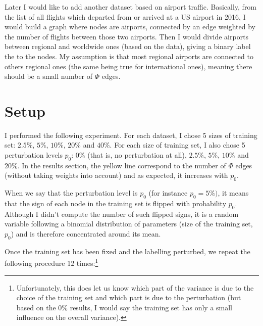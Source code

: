\documentclass[a4paper,final,notitlepage,11pt,svgnames]{article}
\begin{document}
Later I would like to add another dataset based on airport traffic. Basically,
from the list of all flights which departed from or arrived at a US airport in
2016, I would build a graph where nodes are airports, connected by an edge
weighted by the number of flights between those two airports. Then I would
divide airports between regional and worldwide ones (based on the data), giving
a binary label the to the nodes. My assumption is that most regional airports
are connected to others regional ones (the same being true for international
ones), meaning there should be a small number of $\Phi$ edges.

\section*{Setup}
\label{sec:Protocol}

I performed the following experiment. For each dataset, I chose 5 sizes of
training set: $2.5\%$, $5\%$, $10\%$, $20\%$ and $40\%$. For each size of
training set, I also chose 5 perturbation levels $p_0$: $0\%$ (that is, no
perturbation at all), $2.5\%$, $5\%$, $10\%$ and $20\%$. In the results section,
the yellow line correspond to the number of $\Phi$ edges (without taking weights
into account) and as expected, it increases with $p_0$.

When we say that the perturbation level is $p_0$ (for instance $p_0=5\%)$, it
means that the sign of each node in the training set is flipped with probability
$p_0$. Although I didn't compute the number of such flipped signs, it is a
random variable following a binomial distribution of parameters (size of the
training set, $p_0$) and is therefore concentrated around its mean.
\iffalse
the actual probability $p_i$ of each node $i$ to have its sign flipped depends of
its degree $d_i$ in the following way. Denoting $\bar{d}$ the average degree and
$\Delta$ the maximum degree, we first map linearly degrees in the interval $[0,
\bar{d}]$ to probability in $[0, p_0]$ and degrees in the interval $[\bar{d},
\Delta]$ to probability in $[p_0, 2p_0]$. Then we rescale the resulting
probabilities so that their average is $p_0$.
\fi

Once the training set has been fixed and the labelling perturbed, we repeat the
following procedure 12 times:\footnote{Unfortunately, this does let us know
which part of the variance is due to the choice of the training set and which
part is due to the perturbation (but based on the $0\%$ results, I would say the
training set has only a small influence on the overall variance).}
\end{document}
